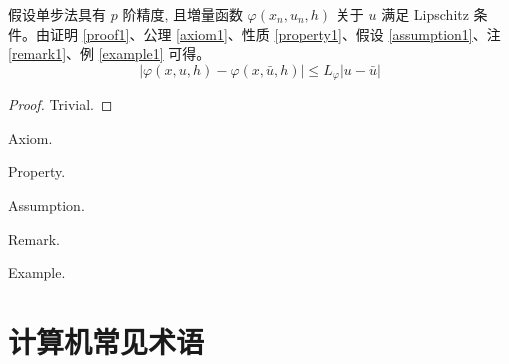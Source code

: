 \documentclass[report,oneside,UTF8,zihao=-4]{config}
\begin{document}
\begin{corollary}\label{col-convergence}
    假设单步法具有 $p$ 阶精度, 且増量函数 $\varphi(x_{n}, u_{n}, h)$ 关于 $u$ 满足 {\rm Lipschitz} 条件。由证明 \ref{proof1}、公理 \ref{axiom1}、性质 \ref{property1}、假设 \ref{assumption1}、注 \ref{remark1}、例 \ref{example1} 可得。
    \begin{equation}\label{eqn:5}
        |\varphi(x, u, h)-\varphi(x, \bar{u}, h)| \leqslant L_{\varphi}|u-\bar{u}|
    \end{equation}
\end{corollary}

\begin{proof}\label{proof1}
    Trivial. \QED
\end{proof}

\begin{axiom}\label{axiom1}
    Axiom.
\end{axiom}

\begin{property}\label{property1}
    Property. 
\end{property}

\begin{assumption}\label{assumption1}
    Assumption.
\end{assumption}

\begin{remark}\label{remark1}
    Remark.
\end{remark}

\begin{example}\label{example1}
    Example.
\end{example}


\begin{references}
\end{references}


\StartAppendix %

\chapter{计算机常见术语}
\label{tab:appendix-table}
\end{document}
